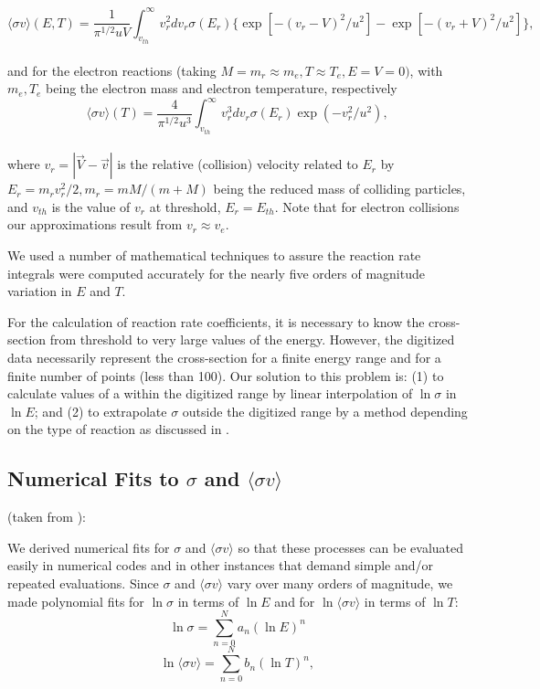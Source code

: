\documentclass[12pt,dvipdfmx]{article}
\begin{document}
      $$\langle\sigma v\rangle(E,T) = \frac {1}{\pi^{1/2}uV} {\int_{v_{th}}^\infty}  v_r^2dv_r\sigma(E_r) \{\exp[-(v_r-V)^2/u^2]
-\exp[-(v_r+V) ^2/u^2]\},$$\\

and for the electron reactions (taking $M= m_r \approx m_e, T \approx T_e, E=V=0)$,  with $m_e, T_e$ being the electron mass and electron temperature,
respectively\\

      $$\langle\sigma v\rangle(T) = \frac {4}{\pi^{1/2}u^3} {\int_{v_{th}}^\infty} v_r^3dv_r\sigma(E_r) \exp(-v_r^2/u^2), $$\\

where $v_r = |\vec{V}-\vec{v}|$ is the relative (collision) velocity related to $E_r$ by
$E_r = m_r v_r^2/2, m_r = mM/(m+M)$ being
the reduced mass of colliding particles, and $v_{th}$ is the value of $v_r$ at
threshold, $E_r = E_{th}$.
Note that for electron collisions our approximations result from $v_r\approx v_e$.

We used a
number of mathematical techniques to assure the reaction rate integrals were computed accurately for the
nearly five orders of magnitude variation in $E$ and $T$.

For the calculation of reaction rate coefficients, it is necessary
to know the cross-section from threshold to very large values of
the energy. However, the digitized data necessarily represent the
cross-section for a finite energy range and for a finite number of
points (less than 100). Our solution to this problem is: (1) to
calculate values of a within the digitized range by  linear
interpolation of $\ln \sigma$ in $\ln E$; and (2) to extrapolate
$\sigma$ outside the digitized range by a method depending on the
type of reaction as discussed in \cite{kn:Janev}.


\subsection{Numerical Fits to $\sigma$ and $\langle\sigma v\rangle$}
(taken from \cite{kn:Janev}):

We derived numerical fits for $\sigma$ and $\langle\sigma v\rangle$ so that these processes can be evaluated easily in
numerical codes and in other instances that demand simple and/or repeated evaluations. Since $\sigma$ and $\langle\sigma v\rangle$
vary over many orders of magnitude, we made polynomial fits for $\ln \sigma$ in terms of $\ln E$ and for $\ln \langle\sigma v\rangle$
in terms of $\ln T$:\\
\begin{equation}\label{1}
      \ln \sigma = \sum_{n=0}^N a_n (\ln E)^n
\end{equation}
\begin{equation}\label{2}
     \ln \langle\sigma v\rangle = \sum_{n=0}^N b_n (\ln T)^n,
\end{equation}
\end{document}
